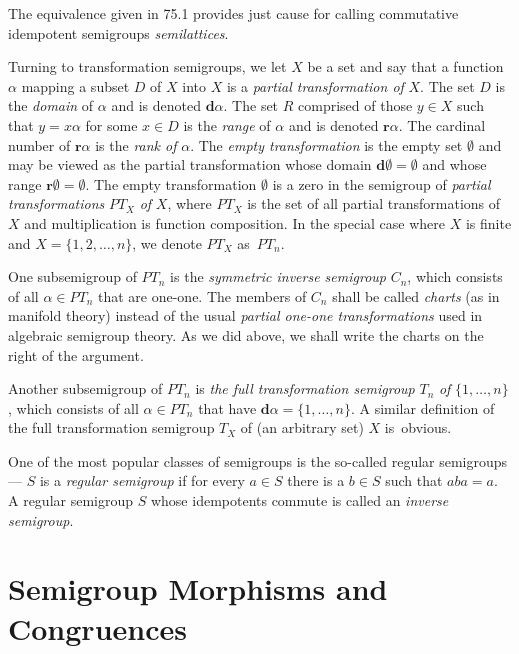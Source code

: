 \documentclass{surv-l}
\numberwithin{equation}{section}
\numberwithin{table}{section}
\numberwithin{figure}{section}
\theoremstyle{plain}
\theoremstyle{definition}
\begin{document}
The equivalence given in 75.1 provides just cause for calling
commutative idempotent semigroups \emph{semilattices}.

Turning to transformation semigroups, we let $X$ be a set and say
that a function $\alpha$ mapping a subset $D$ of $X$ into $X$ is a
\emph{partial transformation of}
$X$. The set $D$ is the \emph{domain} of $\alpha$ and is denoted
$\mathbf{d}\alpha$. The set $R$ comprised of those $y\in X$ such
that $ y=x\alpha$ for some $x\in D$ is the \emph{range} of
$\alpha$ and is denoted $\mathbf{r}\alpha$. The cardinal number of
$\mathbf{r}\alpha$ is the \emph{rank of} $\alpha$. The \emph{empty
transformation} is the empty set
$\emptyset$ and may be viewed as the partial transformation whose
domain $\mathbf{d}\emptyset=\emptyset$ and whose range
$\mathbf{r}\emptyset=\emptyset$. The empty transformation
$\emptyset$ is a zero in the semigroup of \emph{partial transformations}
$PT_{X}$
\emph{of} $X$, where $PT_{X}$ is the set of all partial
transformations of $X$ and multiplication is function composition.
In the special case where $X$ is finite and $X=\{1,2,\ldots, n\}$,
we denote $PT_{X}$ as~$PT_{n}$.

One subsemigroup of $PT_{n}$ is the \emph{symmetric inverse
semigroup} $C_{n}$, which consists
of all $\alpha\in PT_{n}$ that are one-one. The members of $C_{n}$
shall be called \emph{charts} (as in manifold theory) instead of
the usual \emph{partial one-one transformations} used in algebraic
semigroup theory. As we did above, we shall write the charts on
the right of the argument.

Another subsemigroup of $PT_{n}$ is \emph{the full transformation
semigroup} $T_{n}$ \emph{of} $\{1,\ldots, n\}$, which consists of
all $\alpha\in PT_{n}$ that have $\mathbf{d}\alpha=\{1,\ldots,
n\}$. A similar definition of the full transformation semigroup
$T_{X}$ of (an arbitrary set) $X$ is~obvious.

One of the most popular classes of semigroups is the so-called
regular semigroups --- $S$ is a \emph{regular semigroup} if for
every $a \in S$ there is a $b\in S$ such that $aba=a$. A regular
semigroup $S$ whose idempotents commute is called an \emph{inverse
semigroup}.

\section{Semigroup Morphisms and Congruences}\label{secA.76}
\end{document}
